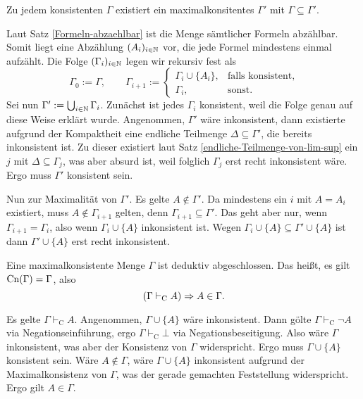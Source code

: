 \begin{Satz}\label{Lemma-Lindenbaum}\newlinefirst
Zu jedem konsistenten $\Gamma$ existiert ein maximalkonsitentes
$\Gamma'$ mit $\Gamma\subseteq\Gamma'$.
\end{Satz}
\begin{Beweis}
Laut Satz \ref{Formeln-abzaehlbar} ist die Menge sämtlicher Formeln
abzählbar. Somit liegt eine Abzählung $(A_i)_{i\in\mathbb N}$ vor, die jede
Formel mindestens einmal aufzählt. Die Folge $(\Gamma_i)_{i\in\mathbb N}$
legen wir rekursiv fest als
\[\Gamma_0 := \Gamma,\qquad \Gamma_{i+1} := \begin{cases}
\Gamma_i\cup\{A_i\}, & \text{falls konsistent},\\
\Gamma_i, & \text{sonst}.
\end{cases}\]
Sei nun $\Gamma':=\bigcup_{i\in\mathbb N}\Gamma_i$. Zunächst ist jedes
$\Gamma_i$ konsistent, weil die Folge genau auf diese Weise erklärt
wurde. Angenommen, $\Gamma'$ wäre inkonsistent, dann existierte aufgrund
der Kompaktheit eine endliche Teilmenge $\Delta\subseteq\Gamma'$, die
bereits inkonsistent ist. Zu dieser existiert laut Satz
\ref{endliche-Teilmenge-von-lim-sup} ein $j$ mit $\Delta\subseteq\Gamma_j$,
was aber absurd ist, weil folglich $\Gamma_j$ erst recht inkonsistent wäre.
Ergo muss $\Gamma'$ konsistent sein.

Nun zur Maximalität von $\Gamma'$. Es gelte $A\notin\Gamma'$. Da
mindestens ein $i$ mit $A=A_i$ existiert, muss $A\notin\Gamma_{i+1}$
gelten, denn $\Gamma_{i+1}\subseteq\Gamma'$. Das geht aber nur, wenn
$\Gamma_{i+1}=\Gamma_i$, also wenn $\Gamma_i\cup\{A\}$ inkonsistent ist.
Wegen $\Gamma_i\cup\{A\}\subseteq\Gamma'\cup\{A\}$ ist dann
$\Gamma'\cup\{A\}$ erst recht inkonsistent.\,\qedsymbol
\end{Beweis}

\begin{Satz}\label{maxkon-abgeschlossen}
Eine maximalkonsistente Menge $\Gamma$ ist deduktiv abgeschlossen.
Das heißt, es gilt $\operatorname{Cn}(\Gamma)=\Gamma$, also
\[(\Gamma\vdash_{\mathrm C} A)\Rightarrow A\in\Gamma.\]
\end{Satz}
\begin{Beweis}
Es gelte $\Gamma\vdash_{\mathrm C} A$. Angenommen, $\Gamma\cup\{A\}$
wäre inkonsistent. Dann gölte $\Gamma\vdash_{\mathrm C}\lnot A$
via Negationseinführung, ergo $\Gamma\vdash_{\mathrm C}\bot$ via
Negationsbeseitigung. Also wäre $\Gamma$ inkonsistent, was aber der
Konsistenz von $\Gamma$ widerspricht. Ergo muss $\Gamma\cup\{A\}$
konsistent sein. Wäre $A\notin\Gamma$, wäre $\Gamma\cup\{A\}$
inkonsistent aufgrund der Maximalkonsistenz von $\Gamma$, was der
gerade gemachten Feststellung widerspricht.
Ergo gilt $A\in\Gamma$.\,\qedsymbol
\end{Beweis}

